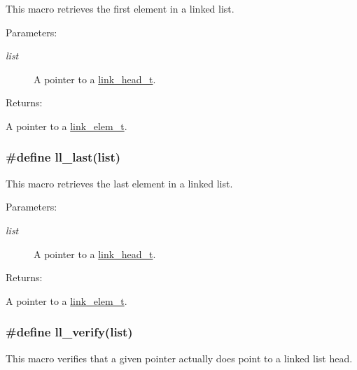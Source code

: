 This macro retrieves the first element in a linked list.\begin{Desc}
\item[Parameters: ]\par
\begin{description}
\item[{\em 
list}]A pointer to a \hyperlink{group__dbprim__link_a0}{link\_\-head\_\-t}.\end{description}
\end{Desc}
\begin{Desc}
\item[Returns: ]\par
A pointer to a \hyperlink{group__dbprim__link_a1}{link\_\-elem\_\-t}. \end{Desc}
\hypertarget{group__dbprim__link_a17}{
\subsubsection[ll\_\-last]{\setlength{\rightskip}{0pt plus 5cm}\#define ll\_\-last(list)}}
\label{group__dbprim__link_a17}


This macro retrieves the last element in a linked list.\begin{Desc}
\item[Parameters: ]\par
\begin{description}
\item[{\em 
list}]A pointer to a \hyperlink{group__dbprim__link_a0}{link\_\-head\_\-t}.\end{description}
\end{Desc}
\begin{Desc}
\item[Returns: ]\par
A pointer to a \hyperlink{group__dbprim__link_a1}{link\_\-elem\_\-t}. \end{Desc}
\hypertarget{group__dbprim__link_a14}{
\subsubsection[ll\_\-verify]{\setlength{\rightskip}{0pt plus 5cm}\#define ll\_\-verify(list)}}
\label{group__dbprim__link_a14}


This macro verifies that a given pointer actually does point to a linked list head.

